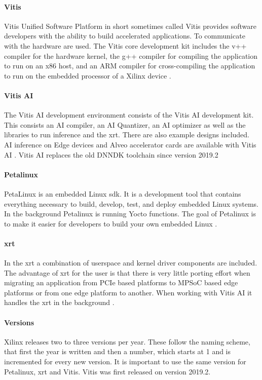 \paragraph{Vitis}
Vitis Unified Software Platform in short sometimes called Vitis provides software developers with the ability to build accelerated applications.
To communicate with the hardware  are used.
The Vitis core development kit includes the v++ compiler for the hardware kernel, the g++ compiler for compiling the application to run on an x86 host, and an ARM compiler for cross-compiling the application to run on the embedded processor of a Xilinx device \cite{vitis_user_guide}.

\paragraph{Vitis AI}
The Vitis AI development environment consists of the Vitis AI development kit.
This consists an AI compiler, an AI Quantizer, an AI optimizer as well as the libraries to run inference and the \acrfull{xrt}.
There are also example designs included.
AI inference on Edge devices and Alveo accelerator cards are available with Vitis AI \cite{vitis_ai_user_guide}.
Vitis AI replaces the old DNNDK toolchain since version 2019.2 

\paragraph{Petalinux}
PetaLinux is an embedded Linux \acrfull{sdk}.
It is a development tool that contains everything necessary to build, develop, test, and deploy embedded Linux systems.
In the background Petalinux is running Yocto functions.
The goal of Petalinux is to make it easier for developers to build your own embedded Linux \cite{petalinux_user_guide}.

\paragraph{\Acrfull{xrt}}
In the \acrfull{xrt} a combination of userspace and kernel driver components are included.
The advantage of \acrshort{xrt} for the user is that there is very little porting effort when migrating an application from PCIe based platforms to MPSoC based edge platforms or from one edge platform to another.
When working with Vitis AI it handles the \acrshort{xrt} in the background \cite{xrt_overview}.

\paragraph{Versions}
Xilinx releases two to three versions per year.
These follow the naming scheme, that first the year is written and then a number, which starts at 1 and is incremented for every new version.
It is important to use the same version for Petalinux, \acrshort{xrt} and Vitis.
Vitis was first released on version 2019.2.

